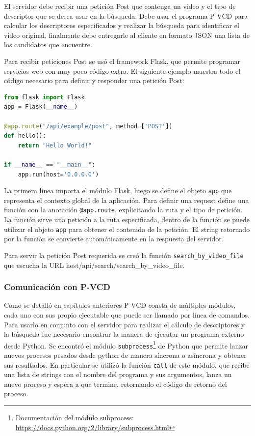 El servidor debe recibir una petición Post que contenga un video y el tipo de descriptor que se desea usar en la búsqueda. Debe usar el programa P-VCD para calcular los descriptores especificados y realizar la búsqueda para identificar el video original, finalmente debe entregarle al cliente en formato JSON una lista de los candidatos que encuentre.

Para recibir peticiones Post se usó el framework Flask, que permite programar servicios web con muy poco código extra. El siguiente ejemplo muestra todo el código necesario para definir y responder una petición Post:
\begin{lstlisting}[language=python]
from flask import Flask
app = Flask(__name__)

@app.route("/api/example/post", method=['POST'])
def hello():
	return "Hello World!"
	
if __name__ == "__main__":
	app.run(host='0.0.0.0')
\end{lstlisting}

La primera línea importa el módulo Flask, luego se define el objeto \texttt{app} que representa el contexto global de la aplicación. Para definir una request define una función con la anotación \texttt{@app.route}, explicitando la ruta y el tipo de petición. La función sirve una petición a la ruta especificada, dentro de la función se puede utilizar el objeto \texttt{app} para obtener el contenido de la petición. El string retornado por la función se convierte automáticamente en la respuesta del servidor.

Para servir la petición Post requerida se creó la función \texttt{search\_by\_video\_file} que escucha la URL host/api/search/search\_by\_video\_file.

\subsubsection*{Comunicación con P-VCD}
Como se detalló en capítulos anteriores P-VCD consta de múltiples módulos, cada uno con sus propio ejecutable que puede ser llamado por línea de comandos. Para usarlo en conjunto con el servidor para realizar el cálculo de descriptores y la búsqueda fue necesario encontrar la manera de ejecutar un programa externo desde Python.
Se encontró el módulo \texttt{subprocess}\footnote{Documentación del módulo subprocess: \url{https://docs.python.org/2/library/subprocess.html}} de Python que permite lanzar nuevos procesos pesados desde python de manera síncrona o asíncrona y obtener sus resultados. En particular se utilizó la función \texttt{call} de este módulo, que recibe una lista de strings con el nombre del programa y sus argumentos, lanza un nuevo proceso y espera a que termine, retornando el código de retorno del proceso.


